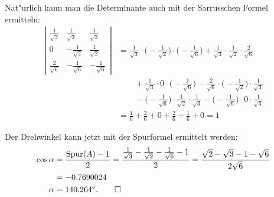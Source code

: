 \begin{loesung}
\begin{teilaufgaben}
Nat"urlich kann man die Determinante auch mit der Sarrusschen Formel ermitteln:
\begin{align*}
\left|
\begin{matrix}
\frac1{\sqrt{3}}&\frac1{\sqrt{3}}&\frac1{\sqrt{3}}\\
0&-\frac1{\sqrt{2}}&\frac1{\sqrt{2}}\\
\frac2{\sqrt{6}}&-\frac1{\sqrt{6}}&-\frac1{\sqrt{6}}
\end{matrix}
\right|
&=
\frac1{\sqrt{3}}\cdot\biggl(-\frac1{\sqrt{2}}\biggr)\cdot\biggl(-\frac1{\sqrt{6}}\biggr)
+
\frac1{\sqrt{3}}\cdot\frac1{\sqrt{2}}\cdot\frac2{\sqrt{6}}
\\
&\qquad 
+
\frac1{\sqrt{3}}\cdot0\cdot\biggl(-\frac1{\sqrt{6}}\biggr)
-
\frac2{\sqrt{6}}\cdot\biggl(-\frac1{\sqrt{2}}\biggr)\cdot\frac1{\sqrt{3}}
\\
&\qquad
-
\biggl(-\frac1{\sqrt{6}}\biggr)\cdot\frac1{\sqrt{2}}\cdot \frac1{\sqrt{3}}
-
\biggl(-\frac1{\sqrt{6}}\biggr)\cdot0\cdot\frac1{\sqrt{3}}
\\
&=
\frac16+\frac26+0+\frac26+\frac16+0=1
\end{align*}
\item
Der Drehwinkel kann jetzt mit der Spurformel ermittelt werden:
\begin{align*}
\cos \alpha
&=\frac{\operatorname{Spur}(A)-1}2
=\frac{\frac1{\sqrt{3}}-\frac1{\sqrt{2}}-\frac1{\sqrt{6}}-1}2
=\frac{\sqrt{2}-\sqrt{3}-1-\sqrt{6}}{2\sqrt{6}}
\\
&=-0.7690024
\\
\alpha&=140.264^\circ.
\qedhere
\end{align*}
\end{teilaufgaben}
\end{loesung}


